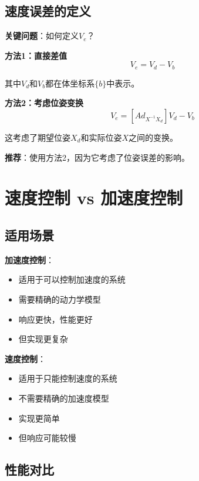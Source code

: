 \documentclass[12pt,a4paper]{article}
\begin{document}
\subsection{速度误差的定义}

\textbf{关键问题}：如何定义$V_e$？

\textbf{方法1：直接差值}
\begin{equation}
V_e = V_d - V_b
\end{equation}

其中$V_d$和$V_b$都在体坐标系$\{b\}$中表示。

\textbf{方法2：考虑位姿变换}
\begin{equation}
V_e = [Ad_{X^{-1}X_d}]V_d - V_b
\end{equation}

这考虑了期望位姿$X_d$和实际位姿$X$之间的变换。

\textbf{推荐}：使用方法2，因为它考虑了位姿误差的影响。

\section{速度控制 vs 加速度控制}

\subsection{适用场景}

\textbf{加速度控制}：
\begin{itemize}
\item 适用于可以控制加速度的系统
\item 需要精确的动力学模型
\item 响应更快，性能更好
\item 但实现更复杂
\end{itemize}

\textbf{速度控制}：
\begin{itemize}
\item 适用于只能控制速度的系统
\item 不需要精确的加速度模型
\item 实现更简单
\item 但响应可能较慢
\end{itemize}

\subsection{性能对比}
\end{document}
